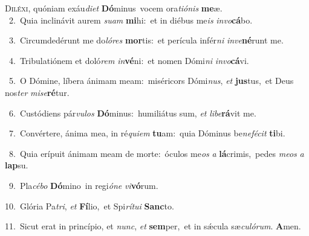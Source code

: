 \lettrine{\initial\textcolor{\initialcolor}{D}}{iléxi,} quóniam exáu\-\textit{di}\-\textit{et} \textbf{Dó}\-minus~\star vocem ora\-\textit{ti}\-\textit{ó}\textit{nis} \textbf{me}\-æ.\\
{\numbfont\textcolor{\numbcolor}{~2.}}~Quia inclinávit aurem \textit{su}\-\textit{am} \textbf{mi}\-hi:~\star et in diébus me\textit{is} \textit{in}\-\textit{vo}\textbf{cá}bo.\par
{\numbfont\textcolor{\numbcolor}{~3.}}~Circumdedérunt me do\-\textit{ló}\-\textit{res} \textbf{mor}\-tis:~\star et perícula infér\textit{ni} \textit{in}\-\textit{ve}\textbf{né}runt me.\par
{\numbfont\textcolor{\numbcolor}{~4.}}~Tribulatiónem et doló\textit{rem} \textit{in}\-\textbf{vé}ni:~\star et nomen Dómi\textit{ni} \textit{in}\-\textit{vo}\textbf{cá}vi.\par
{\numbfont\textcolor{\numbcolor}{~5.}}~O Dómine, líbera ánimam meam:~\dagger miséricors Dómi\-\textit{nus}\-, \textit{et} \textbf{jus}\-tus,~\star et Deus nos\textit{ter} \textit{mi}\-\textit{se}\textbf{ré}tur.\par
{\numbfont\textcolor{\numbcolor}{~6.}}~Custódiens pár\-\textit{vu}\-\textit{los} \textbf{Dó}\-minus:~\star humiliátus sum, \textit{et} \textit{li}\-\textit{be}\textbf{rá}vit me.\par
{\numbfont\textcolor{\numbcolor}{~7.}}~Convértere, ánima mea, in ré\-\textit{qui}\-\textit{em} \textbf{tu}\-am:~\star quia Dóminus be\-\textit{ne}\-\textit{fé}\textit{cit} \textbf{ti}\-bi.\par
{\numbfont\textcolor{\numbcolor}{~8.}}~Quia erípuit ánimam meam de morte:~\dagger óculos me\textit{os} \textit{a} \textbf{lá}\-crimis,~\star pedes \textit{me}\-\textit{os} \textit{a} \textbf{lap}\-su.\par
{\numbfont\textcolor{\numbcolor}{~9.}}~Pla\-\textit{cé}\-\textit{bo} \textbf{Dó}\-mino~\star in regi\-\textit{ó}\-\textit{ne} \textit{vi}\-\textbf{vó}rum.\par
{\numbfont\textcolor{\numbcolor}{10.}}~Glória Pa\-\textit{tri}\-, \textit{et} \textbf{Fí}\-lio,~\star et Spi\-\textit{rí}\-\textit{tu}\textit{i} \textbf{Sanc}\-to.\par
{\numbfont\textcolor{\numbcolor}{11.}}~Sicut erat in princípio, et \textit{nunc}\-, \textit{et} \textbf{sem}\-per,~\star et in sǽcula sæ\-\textit{cu}\-\textit{ló}\textit{rum}. \textbf{A}\-men.\par
